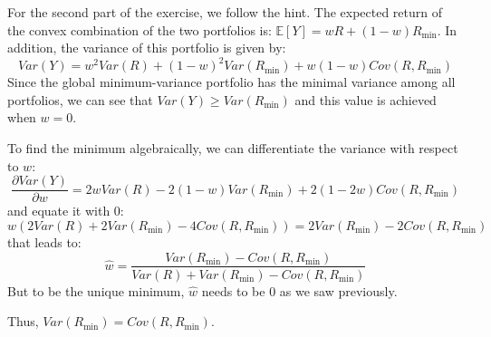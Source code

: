 \documentclass[10pt]{article}
\newcommand{\Ebb}{\mathbb{E}}
\newenvironment{exercise}[2][Exercise]{\begin{trivlist}
  \item[\hskip \labelsep {\bfseries #1}\hskip \labelsep {\bfseries #2.}]}{\end{trivlist}}
\begin{document}
\begin{exercise}{2}
  For the second part of the exercise, we follow the hint. The expected return of the convex combination of the two portfolios is: $ \Ebb[Y] = wR + (1-w)R_{\text{min}}$. In addition, the variance of this portfolio is given by:
  $$ Var(Y) = w^2Var(R) + (1-w)^2Var(R_{\text{min}}) + w(1-w)Cov(R,R_{\text{min}})$$
  Since the global minimum-variance portfolio has the minimal variance among all portfolios, we can see that $Var(Y) \geq Var(R_{\text{min}})$ and this value is achieved when $w = 0$. 

  To find the minimum algebraically, we can differentiate the variance with respect to $w$: $$ \frac{\partial Var(Y)}{\partial w } = 2wVar(R) - 2(1-w)Var(R_{\text{min}})+2(1-2w)Cov(R,R_{\text{min}})$$ and equate it with $0$:
  $$ w(2Var(R) + 2Var(R_{\text{min}})-4Cov(R,R_{\text{min}})) = 2Var(R_{\text{min}})-2Cov(R,R_{\text{min}})$$ that leads to: 
  $$ \hat{w} = \frac{Var(R_{\text{min}})-Cov(R,R_{\text{min}})}{Var(R)+Var(R_{\text{min}})-Cov(R,R_{\text{min}})}$$
  But to be the unique minimum, $\hat{w}$ needs to be $0$ as we saw previously. 

  Thus, $ Var(R_{\text{min}}) = Cov(R,R_{\text{min}})$.


\end{exercise}
  
\end{document}
